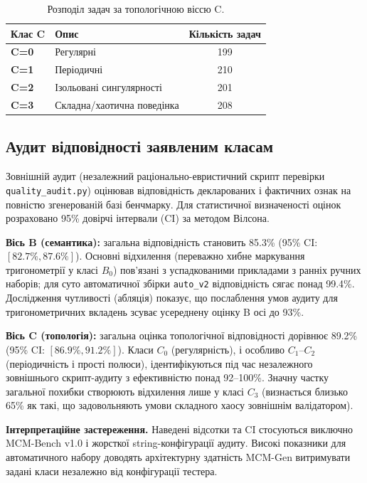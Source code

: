\documentclass[11pt]{article}
\begin{document}
\begin{table}[h]
\centering
\begin{tabular}{llc}
\toprule
\textbf{Клас C} & \textbf{Опис} & \textbf{Кількість задач} \\
\midrule
\textbf{C=0} & Регулярні & 199 \\
\textbf{C=1} & Періодичні & 210 \\
\textbf{C=2} & Ізольовані сингулярності & 201 \\
\textbf{C=3} & Складна/хаотична поведінка & 208 \\
\bottomrule
\end{tabular}
\caption{Розподіл задач за топологічною віссю C.}
\label{tab:coverage_c}
\end{table}

\subsection{Аудит відповідності заявленим класам}

Зовнішній аудит (незалежний раціонально-евристичний скрипт перевірки \texttt{quality\_audit.py}) оцінював відповідність декларованих і фактичних ознак на повністю згенерованій базі бенчмарку. Для статистичної визначеності оцінок розраховано 95\% довірчі інтервали (CI) за методом Вілсона.

\textbf{Вісь B (семантика):} загальна відповідність становить 85.3\% (95\% CI: $[82.7\%, 87.6\%]$). Основні відхилення (переважно хибне маркування тригонометрії у класі $B_0$) пов'язані з успадкованими прикладами з ранніх ручних наборів; для суто автоматичної збірки \texttt{auto\_v2} відповідність сягає понад 99.4\%. Дослідження чутливості (абляція) показує, що послаблення умов аудиту для тригонометричних вкладень зсуває усереднену оцінку B осі до 93\%.

\textbf{Вісь C (топологія):} загальна оцінка топологічної відповідності дорівнює 89.2\% (95\% CI: $[86.9\%, 91.2\%]$). Класи $C_0$ (регулярність), і особливо $C_1$--$C_2$ (періодичність і прості полюси), ідентифікуються під час незалежного зовнішнього скрипт-аудиту з ефективністю понад 92--100\%. Значну частку загальної похибки створюють відхилення лише у класі $C_3$ (визнається близько 65\% як такі, що задовольняють умови складного хаосу зовнішнім валідатором).

\textbf{Інтерпретаційне застереження.}
Наведені відсотки та CI стосуються виключно MCM-Bench v1.0 і жорсткої string-конфігурації аудиту. Високі показники для автоматичного набору доводять архітектурну здатність MCM-Gen витримувати задані класи незалежно від конфігурації тестера.
\end{document}
